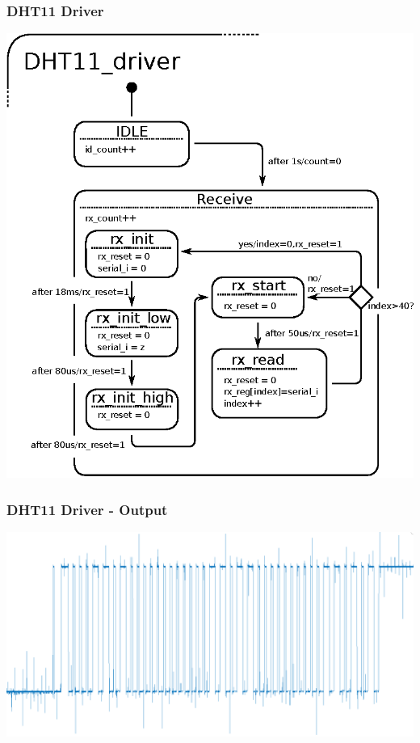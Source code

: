 \documentclass[mathserif]{beamer}
\begin{document}
\begin{frame}
	\frametitle{DHT11 Driver}
	\centering
	\includegraphics[height=.9\textheight]{graphics/dht11driver.eps}
\end{frame}

\begin{frame}
	\frametitle{DHT11 Driver - Output}
	\centering
	\includegraphics[width=1\textwidth]{graphics/temp.png}
\end{frame}
\end{document}
